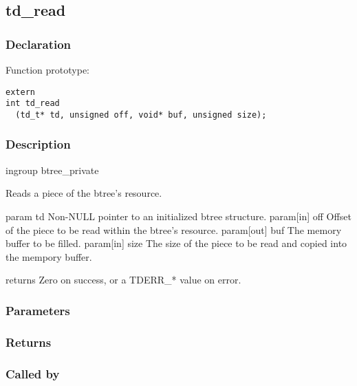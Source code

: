 
\newpage
\subsection{td\_read}
\subsubsection{Declaration} Function prototype:

\begin{verbatim}
extern
int td_read
  (td_t* td, unsigned off, void* buf, unsigned size);
\end{verbatim}

\subsubsection{Description}

 
 ingroup btree\_private 

 Reads a piece of the btree's resource.

 param td Non-NULL pointer to an initialized btree structure.
 param[in] off Offset of the piece to be read within the btree's resource.
 param[out] buf The memory buffer to be filled.
 param[in] size The size of the piece to be read and copied into the
 mempory buffer.

 returns Zero on success, or a TDERR\_* value on error.
 

\subsubsection{Parameters}
\subsubsection{Returns}
\subsubsection{Called by}
